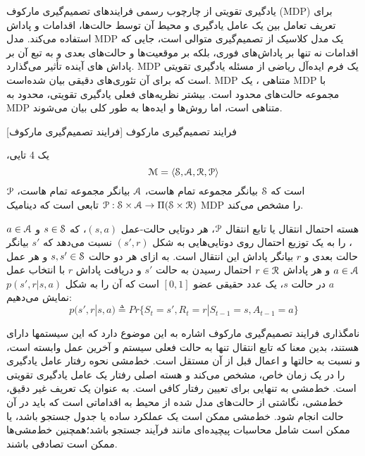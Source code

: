
یادگیری تقویتی از چارچوب رسمی فرایندهای تصمیم‌گیری مارکوف (MDP) برای تعریف تعامل بین یک عامل یادگیری و محیط آن توسط حالت‌ها، اقدامات و پاداش استفاده می‌کند. مدل MDP یک مدل کلاسیک از تصمیم‌گیری متوالی است، جایی که اقدامات نه تنها بر پاداش‌های فوری، بلکه بر موقعیت‌ها و حالت‌های بعدی و به تبع آن بر پاداش های آینده تأثیر می‌گذارد.
MDP
 یک فرم ایده‌آل ریاضی از مسئله یادگیری تقویتی است که برای آن تئوری‌های دقیقی بیان شده‌است.
MDP متناهی ، یک MDP با مجموعه حالت‌های محدود است. 
بیشتر نظریه‌های فعلی یادگیری تقویتی، محدود به MDP متناهی است، اما روش‌ها و ایده‌ها به طور کلی بیان می‌شوند.


[فرایند تصمیم‌گیری مارکوف] 
 فرایند تصمیم‌گیری مارکوف

،یک 4 تایی 
$$\EuScript{M} = \left< \EuScript{S},\EuScript{A},\EuScript{R},\EuScript{P} \right>$$
است که
 $\EuScript{S}$ بیانگر مجموعه تمام \nf هاست،
 $\EuScript{A}$ بیانگر مجموعه تمام \nf هاست،
$\EuScript{P}$
$ \EuScript{P}: \EuScript{S} \times \EuScript{A} \to \Pi(\EuScript{S} \times \EuScript{R})$
تابعی است که دینامیک MDP را مشخص می‌کند.


هسته احتمال انتقال یا تابع انتقال $\EuScript{P}$، هر دوتایی حالت-عمل
$(s,a)$، که 
$s \in \EuScript{S}$
و
$a \in \EuScript{A}$، را به یک توزیع احتمال روی دوتایی‌هایی به شکل 
$(s',r)$
نسبت می‌دهد که $s'$ بیانگر حالت بعدی و $r$ بیانگر پاداش این انتقال است. به ازای هر دو حالت 
$s,s' \in \EuScript{S}$
 و هر عمل 
 $a \in \EuScript{A}$
  و هر پاداش 
  $r \in \EuScript{R}$
  احتمال رسیدن به حالت $s'$ و دریافت پاداش $r$ با انتخاب عمل $a$ در حالت $s$، یک عدد حقیقی عضو $[0,1]$ است که آن را به شکل
$p(s',r|s,a)$
نمایش می‌دهیم:
$$p(s',r|s,a) \triangleq Pr\{S_t=s',R_t=r|S_{t-1}=s,A_{t-1}=a\}$$

نامگذاری فرایند تصمیم‌گیری مارکوف اشاره به این موضوع دارد که این سیستم\nf ها دارای  هستند، بدین معنا که تابع انتقال تنها به حالت فعلی سیستم و آخرین عمل وابسته است، و نسبت به حالت\nf ها و اعمال قبل از آن مستقل است.
خط‌مشی نحوه رفتار عامل یادگیری را در یک زمان خاص، مشخص می‌کند و هسته اصلی رفتار یک عامل یادگیری تقویتی است. خط‌مشی به تنهایی برای تعیین رفتار کافی است. به عنوان یک تعریف غیر دقیق، خط‌مشی، نگاشتی از حالت‌های مدل شده از محیط به اقداماتی است که باید در آن حالت انجام شود.
خط‌مشی ممکن است یک عملکرد ساده یا جدول جستجو باشد، یا ممکن است شامل محاسبات پیچیده‌ای مانند فرآیند جستجو باشد؛همچنین
خط‌مشی‌ها ممکن است تصادفی باشند.

